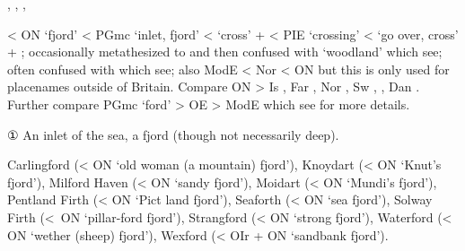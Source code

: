 \documentclass[12pt,letterpaper,oneside,article,draft]{memoir}
\begin{document}
\begin{Lemma}
\begin{Also}
	, , , 
\end{Also}
\begin{Etymology}
	< ON  ‘fjord’ < PGmc  ‘inlet, fjord’
		<  ‘cross’ +  
		< PIE  ‘crossing’ <  ‘go over, cross’ +  ;
		occasionally metathesized to  and then confused with  ‘woodland’ which see;
		often confused with  which see;
		also ModE  < Nor  < ON  but this is only used for
			placenames outside of Britain.
	Compare
	ON  > Is , Far , Nor , Sw , , Dan .
	Further compare
	PGmc  ‘ford’ > OE  > ModE  which see for more details.
\end{Etymology}
\begin{Definitions}
	① An inlet of the sea, a fjord (though not necessarily deep).
\end{Definitions}
\begin{Examples}
	Carlingford (< ON  ‘old woman (a mountain) fjord’),
	Knoydart (< ON  ‘Knut’s fjord’),
	Milford Haven (< ON  ‘sandy fjord’),
	Moidart (< ON  ‘Mundi’s fjord’),
	Pentland Firth (< ON  ‘Pict land fjord’),
	Seaforth (< ON  ‘sea fjord’),
	Solway Firth (<~ON   ‘pillar-ford fjord’),
	Strangford (< ON  ‘strong fjord’),
	Waterford (< ON  ‘wether (sheep) fjord’),
	Wexford (< OIr  + ON  ‘sandbank fjord’).
\end{Examples}
\end{Lemma}
\end{document}
